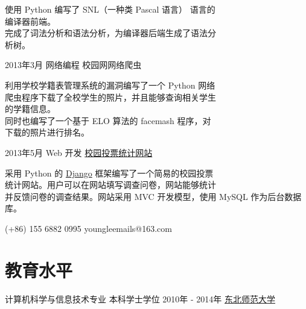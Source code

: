 \documentclass{tccv}
\begin{document}
\begin{eventlist}
  \HiraginoSansGB
  使用 Python 编写了 SNL（一种类 Pascal 语言） 语言的 \\
  编译器前端。 \\
  完成了词法分析和语法分析，为编译器后端生成了语法分 \\
  析树。


\item{\ShiShangZhongHeiJianTi 2013年3月}
  {\ShiShangZhongHeiJianTi 网络编程}
  {\VeraSansYuanTi 校园网网络爬虫}

  \HiraginoSansGB  
  利用学校学籍表管理系统的漏洞编写了一个 Python 网络 \\
  爬虫程序下载了全校学生的照片，并且能够查询相关学生 \\
  的学籍信息。 \\
  同时也编写了一个基于 ELO 算法的 facemash 程序，对 \\
  下载的照片进行排名。


\item{\ShiShangZhongHeiJianTi 2013年5月}
  {\ShiShangZhongHeiJianTi Web 开发}
  {\href{https://github.com/YoungLeeNENU/a-vote-website}{\VeraSansYuanTi 校园投票统计网站}}

  \HiraginoSansGB    
  采用 Python 的 \href{https://www.djangoproject.com/}{Django} 框架编写了一个简易的校园投票 \\
  统计网站。用户可以在网站填写调查问卷，网站能够统计 \\
  并反馈问卷的调查结果。网站采用 MVC 开发模型，使用 MySQL 作为后台数据库。
  

\end{eventlist}

{\VeraSansYuanTi (+86) 155 6882 0995}
{\VeraSansYuanTi youngleemails@163.com}

\section{\ShiShangZhongHeiJianTi 教育水平}

\begin{yearlist}

\item[\HiraginoSansGB 计算机科学与信息技术专业 \newline
  本科学士学位]
  {\ShiShangZhongHeiJianTi 2010年 - 2014年}
  {\href{http://www.nenu.edu.cn/}{\HiraginoSansGB 东北师范大学}}

\end{yearlist}
\end{document}
